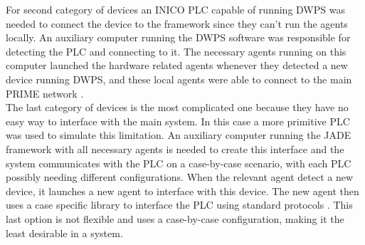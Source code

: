 For second category of devices an INICO \gls{PLC} capable of running \gls{DWPS} was needed to connect the device to the framework since they can't run the agents locally. An auxiliary computer running the \gls{DWPS} software was responsible for detecting the \gls{PLC} and connecting to it. The necessary agents running on this computer launched the hardware related agents whenever they detected a new device running \gls{DWPS}, and these local agents were able to connect to the main PRIME network \cite{PRIME_plug_and_produce}.\\

The last category of devices is the most complicated one because they have no easy way to interface with the main system. In this case a more primitive \gls{PLC} was used to simulate this limitation. An auxiliary computer running the JADE framework with all necessary agents is needed to create this interface and the system communicates with the \gls{PLC} on a case-by-case scenario, with each \gls{PLC} possibly needing different configurations. When the relevant agent detect a new device, it launches a new agent to interface with this device. The new agent then uses a case specific library to interface the \gls{PLC} using standard protocols \cite{PRIME_plug_and_produce}. This last option is not flexible and uses a case-by-case configuration, making it the least desirable in a system.
